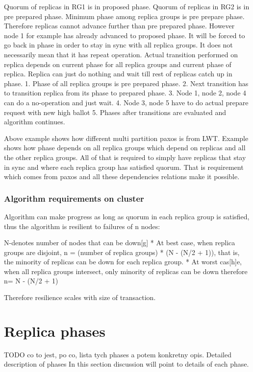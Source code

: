 Quorum of replicas in RG1 is in proposed phase.
Quorum of replicas in RG2 is in pre prepared phase.
Minimum phase among replica groups is pre prepare phase.
        Therefore replicas cannot advance further than pre prepared phase. However node 1 for example has already advanced to proposed phase. It will be forced to go back in phase in order to stay in sync with all replica groups. It does not necessarily mean that it has repeat operation. Actual transition performed on replica depends on current phase for all replica groups and current phase of replica. Replica can just do nothing and wait till rest of replicas catch up in phase.
1. Phase of all replica groups is pre prepared phase.
2. Next transition has to transition replica from its phase to prepared phase.
3. Node 1, node 2, node 4 can do a no-operation and just wait.
4. Node 3, node 5 have to do actual prepare request with new high ballot
5. Phases after transitions are evaluated and algorithm continues.
        
Above example shows how different multi partition paxos is from LWT. Example shows how phase depends on all replica groups which depend on replicas and all the other replica groups. All of that is required to simply have replicas that stay in sync and where each replica group has satisfied quorum. That is requirement which comes from paxos and all these dependencies relations make it possible.


\subsubsection{Algorithm requirements on cluster}
Algorithm can make progress as long as quorum in each replica group is satisfied, thus the algorithm is resilient to failures of n nodes:


        N-denotes number of nodes that can be down[g]
* At best case, when replica groups are disjoint, n = (number of replica groups) * (N - (N/2 + 1)), that is, the minority of replicas can be down for each replica group.
* At worst cas[h]e, when all replica groups intersect, only minority of replicas can be down therefore n= N - (N/2 + 1)



Therefore resilience scales with size of transaction.


\section{Replica phases}
TODO co to jest, po co, lista tych phases a potem konkretny opis.
        Detailed description of phases
In this section discussion will point to details of each phase.


